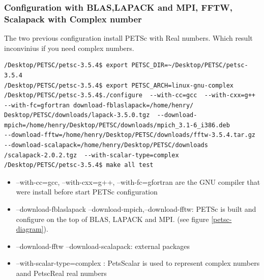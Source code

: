 \documentclass{article}
\begin{document}
\subsubsection{Configuration with BLAS,LAPACK and MPI, FFTW, Scalapack with Complex number}
The two previous configuration install PETSc with Real numbers. Which result inconvinius if you need complex numbers.
\footnotesize
\begin{verbatim}
/Desktop/PETSC/petsc-3.5.4$ export PETSC_DIR=~/Desktop/PETSC/petsc-3.5.4
/Desktop/PETSC/petsc-3.5.4$ export PETSC_ARCH=linux-gnu-complex
/Desktop/PETSC/petsc-3.5.4$./configure  --with-cc=gcc  --with-cxx=g++  --with-fc=gfortran download-fblaslapack=/home/henry/
Desktop/PETSC/downloads/lapack-3.5.0.tgz  --download-mpich=/home/henry/Desktop/PETSC/downloads/mpich_3.1-6_i386.deb 
--download-fftw=/home/henry/Desktop/PETSC/downloads/fftw-3.5.4.tar.gz  --download-scalapack=/home/henry/Desktop/PETSC/downloads
/scalapack-2.0.2.tgz  --with-scalar-type=complex
/Desktop/PETSC/petsc-3.5.4$ make all test 
\end{verbatim}
\normalsize
\begin{itemize}
 \item --with-cc=gcc, --with-cxx=g++, --with-fc=gfortran are the GNU compiler that were install before start PETSc configuration
 \item --download-fblaslapack --download-mpich,--download-fftw: PETSc is built and configure on the top of BLAS, LAPACK and MPI. 
 (see figure \ref{petsc-diagram}). 
  \item --download-fftw --download-scalapack: external packages
  \item --with-scalar-type=complex :  PetsScalar is used to represent complex numbers aand PetscReal real numbers
\end{itemize}
\end{document}
